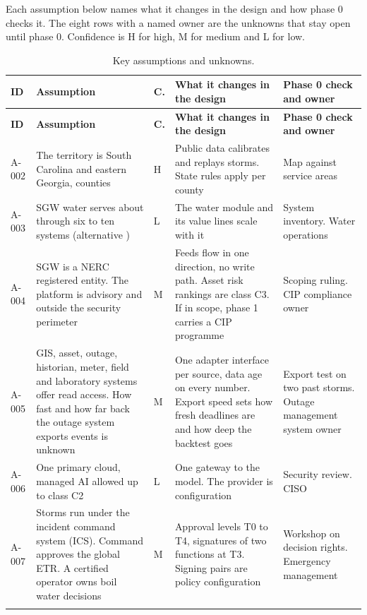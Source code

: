 \documentclass[fontsize=10pt,a4paper,DIV=12,parskip=half-,numbers=noenddot,headsepline,captions=tableheading]{scrartcl}
\begin{document}
Each assumption below names what it changes in the design and how phase 0 checks it. The eight rows with a named owner are the unknowns that stay open until phase 0. Confidence is H for high, M for medium and L for low.
{\footnotesize
\begin{xltabular}{\textwidth}{@{}L{1.05cm} L{4.6cm} L{0.55cm} Y L{3.0cm}@{}}
  \caption{Key assumptions and unknowns.}\label{tab:assumptions}\\
  \toprule
  \textbf{ID} & \textbf{Assumption} & \textbf{C.} & \textbf{What it changes in the design} & \textbf{Phase 0 check and owner} \\ \midrule
  \endfirsthead
  \toprule
  \textbf{ID} & \textbf{Assumption} & \textbf{C.} & \textbf{What it changes in the design} & \textbf{Phase 0 check and owner} \\ \midrule
  \endhead
  \bottomrule
  \endlastfoot
  A-002 & The territory is South Carolina and eastern Georgia,  counties & H & Public data calibrates and replays storms. State rules apply per county & Map against service areas \\ \lightrowrule
  A-003 & SGW water serves about  through six to ten systems (alternative ) & L & The water module and its value lines scale with it & System inventory. Water operations \\ \lightrowrule
  A-004 & SGW is a NERC registered entity. The platform is advisory and outside the security perimeter & M & Feeds flow in one direction, no write path. Asset risk rankings are class C3. If in scope, phase 1 carries a CIP programme & Scoping ruling. CIP compliance owner \\ \lightrowrule
  A-005 & GIS, asset, outage, historian, meter, field and laboratory systems offer read access. How fast and how far back the outage system exports events is unknown & M & One adapter interface per source, data age on every number. Export speed sets how fresh deadlines are and how deep the backtest goes & Export test on two past storms. Outage management system owner \\ \lightrowrule
  A-006 & One primary cloud, managed AI allowed up to class C2 & L & One gateway to the model. The provider is configuration & Security review. CISO \\ \lightrowrule
  A-007 & Storms run under the incident command system (ICS). Command approves the global ETR. A certified operator owns boil water decisions & M & Approval levels T0 to T4, signatures of two functions at T3. Signing pairs are policy configuration & Workshop on decision rights. Emergency management \\ \lightrowrule

\end{xltabular}}
\end{document}
